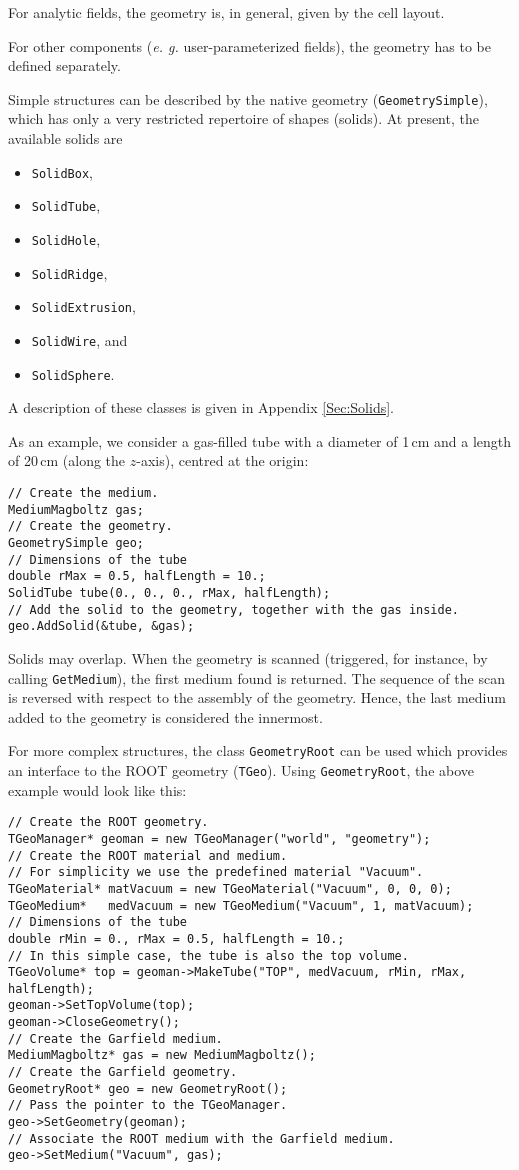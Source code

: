 For analytic fields, the geometry is, in general, given by the 
cell layout.

For other components (\textit{e. g.} user-parameterized fields), 
the geometry has to be defined separately. 

Simple structures can be described by the native geometry (\texttt{GeometrySimple}), which has only a very restricted repertoire of shapes (solids). 
At present, the available solids are
\begin{itemize}
  \item
  \texttt{SolidBox}, 
  \item
  \texttt{SolidTube}, 
  \item
  \texttt{SolidHole}, 
  \item
  \texttt{SolidRidge},
  \item
  \texttt{SolidExtrusion}, 
  \item
  \texttt{SolidWire}, and
  \item
  \texttt{SolidSphere}.
\end{itemize} 
A description of these classes is given in Appendix \ref{Sec:Solids}.

As an example, we consider a gas-filled tube with a diameter of 1\,cm and 
a length of 20\,cm (along the \(z\)-axis), centred at the origin:
\begin{lstlisting}
// Create the medium.
MediumMagboltz gas;
// Create the geometry.
GeometrySimple geo;
// Dimensions of the tube
double rMax = 0.5, halfLength = 10.;
SolidTube tube(0., 0., 0., rMax, halfLength);
// Add the solid to the geometry, together with the gas inside.
geo.AddSolid(&tube, &gas);
\end{lstlisting}

Solids may overlap. 
When the geometry is scanned 
(triggered, for instance, by calling \texttt{GetMedium}), the  
first medium found is returned. 
The sequence of the scan is reversed with respect to the 
assembly of the geometry. 
Hence, the last medium added to the geometry is considered the innermost. 

For more complex structures, the class \texttt{GeometryRoot} can be used 
which provides an interface to the ROOT geometry (\texttt{TGeo}).
Using \texttt{GeometryRoot}, the above example would look like this:
\begin{lstlisting}
// Create the ROOT geometry.
TGeoManager* geoman = new TGeoManager("world", "geometry");
// Create the ROOT material and medium. 
// For simplicity we use the predefined material "Vacuum".
TGeoMaterial* matVacuum = new TGeoMaterial("Vacuum", 0, 0, 0);
TGeoMedium*   medVacuum = new TGeoMedium("Vacuum", 1, matVacuum);
// Dimensions of the tube
double rMin = 0., rMax = 0.5, halfLength = 10.;
// In this simple case, the tube is also the top volume.
TGeoVolume* top = geoman->MakeTube("TOP", medVacuum, rMin, rMax, halfLength);
geoman->SetTopVolume(top);
geoman->CloseGeometry();
// Create the Garfield medium.
MediumMagboltz* gas = new MediumMagboltz();
// Create the Garfield geometry.
GeometryRoot* geo = new GeometryRoot();
// Pass the pointer to the TGeoManager.
geo->SetGeometry(geoman);
// Associate the ROOT medium with the Garfield medium.
geo->SetMedium("Vacuum", gas); 
\end{lstlisting} 

